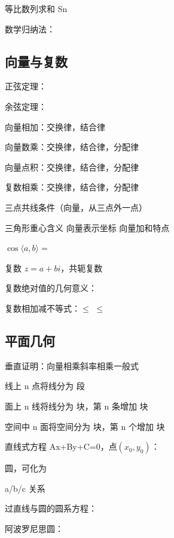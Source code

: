 等比数列求和 Sn \esb  \elb

数学归纳法：

\subsection{向量与复数}

正弦定理：

余弦定理：

向量相加：\sbl 交换律，\sbl 结合律

向量数乘：\sbl 交换律，\sbl 结合律，\sbl 分配律

向量点积：\sbl 交换律，\sbl 结合律，\sbl 分配律

复数相乘：\sbl 交换律，\sbl 结合律，\sbl 分配律

三点共线条件（向量，从三点外一点）

三角形重心含义 \clb 向量表示坐标 \cxlb 向量加和特点 \cxlb

$\cos\langle a,b\rangle =$ \elb

复数 $z=a+bi$，共轭复数 \elb

复数绝对值的几何意义：

复数相加减不等式：\lbl $\leq$ \lbl $\leqslant$ \lbl

\subsection{平面几何}

垂直证明：向量相乘\esb 斜率相乘\esb 一般式\cmb



线上 n 点将线分为 \elb 段

面上 n 线将线分为 \lbl 块，第 n 条增加 \lbl 块

空间中 n 面将空间分为 \lbl 块，第 n 个增加 \lbl 块

直线式方程 Ax+By+C=0，点$(x_0 , y_0)$：


圆\cxlb ，可化为 \xlbl

a/b/c 关系\clb


过直线与圆的圆系方程：\cxlb

阿波罗尼思圆：


